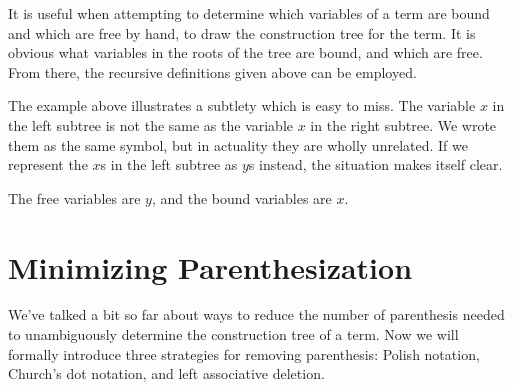 It is useful when attempting to determine which variables of a term are bound and which are free by hand, to draw the construction tree for the term. It is obvious what variables in the roots of the tree are bound, and which are free. From there, the recursive definitions given above can be employed.\\


The example above illustrates a subtlety which is easy to miss. The variable $x$ in the left subtree is not the same as the variable $x$ in the right subtree. We wrote them as the same symbol, but in actuality they are wholly unrelated. If we represent the $x$s in the left subtree as $y$s instead, the situation makes itself clear.

\begin{center}
\end{center}

The free variables are $y$, and the bound variables are $x$.

\section{Minimizing Parenthesization}
We've talked a bit so far about ways to reduce the number of parenthesis needed to unambiguously determine the construction tree of a term. Now we will formally introduce three strategies for removing parenthesis: Polish notation, Church's dot notation, and left associative deletion.

